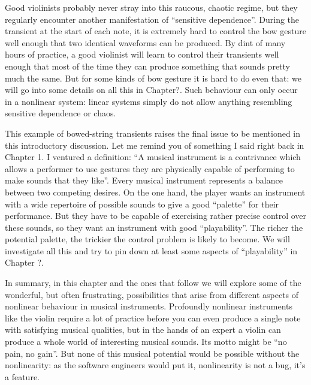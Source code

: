   Good violinists probably never stray into this raucous, chaotic regime, but 
  they regularly encounter another manifestation of “sensitive dependence”. 
  During the transient at the start of each note, it is extremely hard to 
  control the bow gesture well enough that two identical waveforms can be 
  produced. By dint of many hours of practice, a good violinist will learn to 
  control their transients well enough that most of the time they can produce 
  something that sounds pretty much the same. But for some kinds of bow gesture 
  it is hard to do even that: we will go into some details on all this in 
  Chapter?. Such behaviour can only occur in a nonlinear system: linear systems 
  simply do not allow anything resembling sensitive dependence or chaos. 

  This example of bowed-string transients raises the final issue to be 
  mentioned in this introductory discussion. Let me remind you of something I 
  said right back in Chapter 1. I ventured a definition: “A musical instrument 
  is a contrivance which allows a performer to use gestures they are physically 
  capable of performing to make sounds that they like”. Every musical 
  instrument represents a balance between two competing desires. On the one 
  hand, the player wants an instrument with a wide repertoire of possible 
  sounds to give a good “palette” for their performance. But they have to be 
  capable of exercising rather precise control over these sounds, so they want 
  an instrument with good “playability”. The richer the potential palette, the 
  trickier the control problem is likely to become. We will investigate all 
  this and try to pin down at least some aspects of ``playability'' in Chapter 
  ?. 

  In summary, in this chapter and the ones that follow we will explore some of 
  the wonderful, but often frustrating, possibilities that arise from different 
  aspects of nonlinear behaviour in musical instruments. Profoundly nonlinear 
  instruments like the violin require a lot of practice before you can even 
  produce a single note with satisfying musical qualities, but in the hands of 
  an expert a violin can produce a whole world of interesting musical sounds. 
  Its motto might be “no pain, no gain”. But none of this musical potential 
  would be possible without the nonlinearity: as the software engineers would 
  put it, nonlinearity is not a bug, it’s a feature. 

